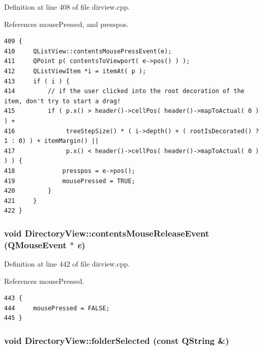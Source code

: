 Definition at line 408 of file dirview.cpp.

References mouse\-Pressed, and presspos.



\footnotesize\begin{verbatim}409 {
410     QListView::contentsMousePressEvent(e);
411     QPoint p( contentsToViewport( e->pos() ) );
412     QListViewItem *i = itemAt( p );
413     if ( i ) {
414         // if the user clicked into the root decoration of the item, don't try to start a drag!
415         if ( p.x() > header()->cellPos( header()->mapToActual( 0 ) ) +
416              treeStepSize() * ( i->depth() + ( rootIsDecorated() ? 1 : 0) ) + itemMargin() ||
417              p.x() < header()->cellPos( header()->mapToActual( 0 ) ) ) {
418             presspos = e->pos();
419             mousePressed = TRUE;
420         }
421     }
422 }
\end{verbatim}\normalsize 
{}
\subsubsection{\setlength{\rightskip}{0pt plus 5cm}void Directory\-View::contents\-Mouse\-Release\-Event (QMouse\-Event $\ast$ {\em e})\hspace{0.3cm}{\tt  [protected]}}\label{classDirectoryView_DirectoryViewb6}




Definition at line 442 of file dirview.cpp.

References mouse\-Pressed.



\footnotesize\begin{verbatim}443 {
444     mousePressed = FALSE;
445 }
\end{verbatim}\normalsize 
{}
\subsubsection{\setlength{\rightskip}{0pt plus 5cm}void Directory\-View::folder\-Selected (const QString \&)\hspace{0.3cm}{\tt  [signal]}}\label{classDirectoryView_DirectoryViewl0}




